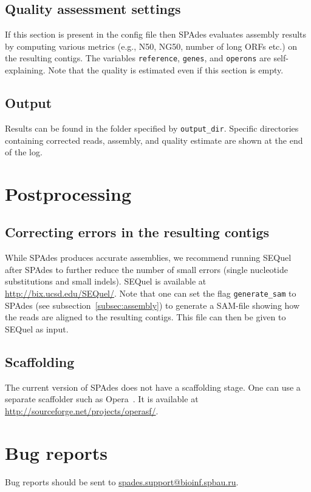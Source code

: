 \documentclass{article}
\def\spades{SPAdes}
\begin{document}
\subsection{Quality assessment settings}
If this section is present in the config file then
{\spades} evaluates assembly results by computing various metrics (e.g., N50, NG50, number of long ORFs etc.) on the resulting contigs.
The variables {\tt reference}, {\tt genes}, and {\tt operons} are self-explaining.
Note that the quality is estimated even if this section is empty.

\subsection{Output}
Results can be found in the folder specified by {\tt output\_dir}.
Specific directories containing corrected reads, assembly, and quality estimate are shown at the end of the log.

\section{Postprocessing}

\subsection{Correcting errors in the resulting contigs}
While {\spades} produces accurate assemblies, 
we recommend running SEQuel~\cite{sequel} after {\spades} to further reduce the number of small errors (single nucleotide substitutions and small indels). SEQuel is available at
\url{http://bix.ucsd.edu/SEQuel/}. Note that one can set the flag {\tt generate\_sam} to {\spades}
(see subsection~\ref{subsec:assembly}) to generate a SAM-file showing how the 
reads are aligned to the resulting contigs. This file can then be given to SEQuel as input.


\subsection{Scaffolding}
The current version of {\spades} does not have a scaffolding stage.
One can use a separate scaffolder such as Opera~\cite{opera}.
It is available at \url{http://sourceforge.net/projects/operasf/}.

\section{Bug reports}
Bug reports should be sent to \url{spades.support@bioinf.spbau.ru}.




\end{document}
